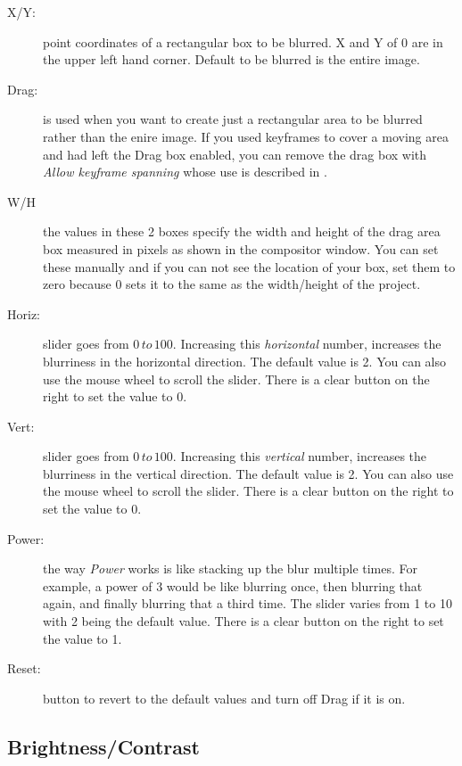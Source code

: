 \begin{description}
    \item[X/Y:] point coordinates of a rectangular box to be blurred. X and Y of 0 are in the
upper left hand corner.  Default to be blurred is the entire image.
    \item[Drag:] is used when you want to create just a rectangular area to be blurred rather
than the enire image. If you used keyframes to cover a moving area and had left the Drag box
enabled, you can remove the drag box with \textit{Allow keyframe spanning} whose use is
described in .
    \item[W/H] the values in these 2 boxes specify the width and height of the drag area box
measured in pixels as shown in the compositor window. You can set these manually and if you
can not see the location of your box, set them to zero because $0$ sets it to the same as the
width/height of the project.
    \item[Horiz:] slider goes from $0\, to\, 100$. Increasing this \textit{horizontal} number,
increases the blurriness in the horizontal direction. The default value is 2. You can also use
the mouse wheel to scroll the slider.  There is a clear button on the right to set the value to 0.
    \item[Vert:] slider goes from $0\, to\, 100$. Increasing this \textit{vertical} number,
increases the blurriness in the vertical direction.  The default value is 2. You can also use
the mouse wheel to scroll the slider. There is a clear button on the right to set the value to 0.
    \item[Power:] the way \textit{Power} works is like stacking up the blur multiple times.
For example, a power of 3 would be like blurring once, then blurring that again, and finally
blurring that a third time. The slider varies from 1 to 10 with 2 being the default value. There
is a clear button on the right to set the value to 1.
    \item[Reset:] button to revert to the default values and turn off Drag if it is on.
\end{description}

\subsection{Brightness/Contrast}%
\label{sub:brightness_contrast}

